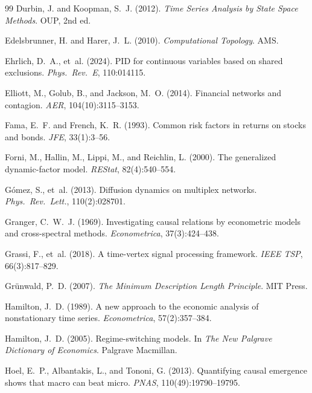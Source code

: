 \documentclass[11pt,a4paper]{article}
\theoremstyle{definition}
\begin{document}
\begin{thebibliography}{99}
Durbin, J. and Koopman, S.~J. (2012). \emph{Time Series Analysis by State Space Methods}. OUP, 2nd ed.

Edelsbrunner, H. and Harer, J.~L. (2010). \emph{Computational Topology}. AMS.

Ehrlich, D.~A., et~al. (2024). PID for continuous variables based on shared exclusions. \emph{Phys.\ Rev.\ E}, 110:014115.

Elliott, M., Golub, B., and Jackson, M.~O. (2014). Financial networks and contagion. \emph{AER}, 104(10):3115--3153.

Fama, E.~F. and French, K.~R. (1993). Common risk factors in returns on stocks and bonds. \emph{JFE}, 33(1):3--56.

Forni, M., Hallin, M., Lippi, M., and Reichlin, L. (2000). The generalized dynamic-factor model. \emph{REStat}, 82(4):540--554.

G\'{o}mez, S., et~al. (2013). Diffusion dynamics on multiplex networks. \emph{Phys.\ Rev.\ Lett.}, 110(2):028701.

Granger, C.~W.~J. (1969). Investigating causal relations by econometric models and cross-spectral methods. \emph{Econometrica}, 37(3):424--438.

Grassi, F., et~al. (2018). A time-vertex signal processing framework. \emph{IEEE TSP}, 66(3):817--829.

Gr\"{u}nwald, P.~D. (2007). \emph{The Minimum Description Length Principle}. MIT Press.

Hamilton, J.~D. (1989). A new approach to the economic analysis of nonstationary time series. \emph{Econometrica}, 57(2):357--384.

Hamilton, J.~D. (2005). Regime-switching models. In \emph{The New Palgrave Dictionary of Economics}. Palgrave Macmillan.

Hoel, E.~P., Albantakis, L., and Tononi, G. (2013). Quantifying causal emergence shows that macro can beat micro. \emph{PNAS}, 110(49):19790--19795.


\end{thebibliography}
\end{document}
